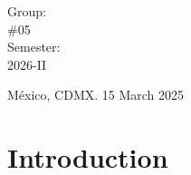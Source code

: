 \documentclass[letterpaper,12pt,oneside]{article}
\begin{document}
\begin{titlepage}
\begin{center}
\begin{center}
				\bigskip
				
				Group: \\
				\#05\\
				Semester: \\
                2026-II
			\end{center}
			
			\vfill
			
			\begin{center}
				{México, CDMX. 15 March 2025}\\
			\end{center}
			\cleardoublepage
		\end{center}
	\end{titlepage}
 
\tableofcontents
\clearpage
    

\section{Introduction} %
\end{document}
